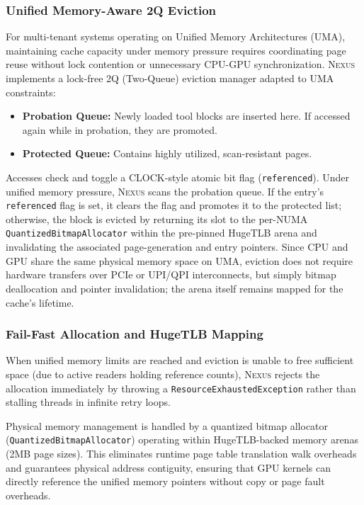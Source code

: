 \documentclass[conference,10pt]{IEEEtran}
\newcommand{\Nexus}{\textsc{Nexus}\xspace}
\begin{document}
\subsubsection{Unified Memory-Aware 2Q Eviction}
For multi-tenant systems operating on Unified Memory Architectures (UMA), maintaining cache capacity under memory pressure requires coordinating page reuse without lock contention or unnecessary CPU-GPU synchronization. \Nexus implements a lock-free 2Q (Two-Queue) eviction manager adapted to UMA constraints:
\begin{itemize}
  \item \textbf{Probation Queue:} Newly loaded tool blocks are inserted here. If accessed again while in probation, they are promoted.
  \item \textbf{Protected Queue:} Contains highly utilized, scan-resistant pages.
\end{itemize}
Accesses check and toggle a CLOCK-style atomic bit flag (\texttt{referenced}). Under unified memory pressure, \Nexus scans the probation queue. If the entry's \texttt{referenced} flag is set, it clears the flag and promotes it to the protected list; otherwise, the block is evicted by returning its slot to the per-NUMA \texttt{QuantizedBitmapAllocator} within the pre-pinned HugeTLB arena and invalidating the associated page-generation and entry pointers. Since CPU and GPU share the same physical memory space on UMA, eviction does not require hardware transfers over PCIe or UPI/QPI interconnects, but simply bitmap deallocation and pointer invalidation; the arena itself remains mapped for the cache's lifetime.

\subsubsection{Fail-Fast Allocation and HugeTLB Mapping}
When unified memory limits are reached and eviction is unable to free sufficient space (due to active readers holding reference counts), \Nexus rejects the allocation immediately by throwing a \texttt{ResourceExhaustedException} rather than stalling threads in infinite retry loops.

Physical memory management is handled by a quantized bitmap allocator (\texttt{QuantizedBitmapAllocator}) operating within HugeTLB-backed memory arenas (2MB page sizes). This eliminates runtime page table translation walk overheads and guarantees physical address contiguity, ensuring that GPU kernels can directly reference the unified memory pointers without copy or page fault overheads.
\end{document}
